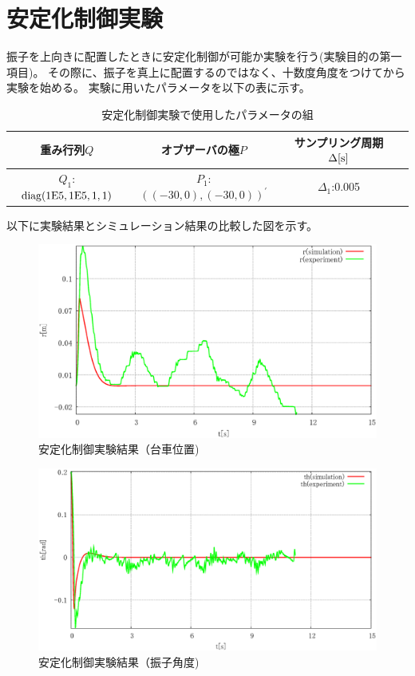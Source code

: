 \section{安定化制御実験}
	振子を上向きに配置したときに安定化制御が可能か実験を行う(実験目的の第一項目)。
	その際に、振子を真上に配置するのではなく、十数度角度をつけてから実験を始める。
	実験に用いたパラメータを以下の表に示す。
	\begin{table}[H]
		\begin{center}
			\caption{安定化制御実験で使用したパラメータの組}
			\medskip
			
			\begin{tabular}{|c|c|c|c|}\hline
				重み行列$Q$ & オブザーバの極$P$ & サンプリング周期$\Delta[\rm{s}]$ \\ \hline\hline
				$Q_1$:$\rm{diag}(1E5,1E5,1,1)$ & $P_1$:$((-30,0),(-30,0))^{'}$ & $\Delta_1$:0.005 \\ \hline
			\end{tabular}
		\end{center}
		\label{table:huriage_control}
	\end{table}
	以下に実験結果とシミュレーション結果の比較した図を示す。
	\begin{figure}[H]
		\centering
		\includegraphics[width=0.8\linewidth]{gazo/experiment_control_R.eps}
		\caption{安定化制御実験結果（台車位置)}
		\label{image:experiment_control_R}
	\end{figure}
	\begin{figure}[H]
		\centering
		\includegraphics[width=0.8\linewidth]{gazo/experiment_control_TH.eps}
		\caption{安定化制御実験結果（振子角度)}
		\label{image:experiment_control_TH}
	\end{figure}
